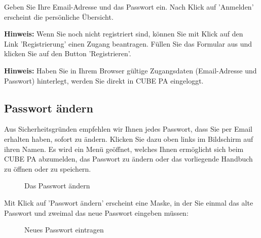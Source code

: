 Geben Sie Ihre Email-Adresse und das Passwort ein. Nach Klick auf 'Anmelden' erscheint die persönliche Übersicht.

\vspace{\baselineskip}

\textbf{Hinweis:} Wenn Sie noch nicht registriert sind, können Sie mit Klick auf den Link 'Registrierung' einen Zugang beantragen. Füllen Sie das Formular aus und klicken Sie auf den Button 'Registrieren'.

\vspace{\baselineskip}

\textbf{Hinweis:} Haben Sie in Ihrem Browser gültige Zugangsdaten (Email-Adresse und Passwort) hinterlegt, werden Sie direkt in CUBE PA eingeloggt.

\subsection{Passwort ändern}
\label{bkm:Ref434828103}

Aus Sicherheitsgründen empfehlen wir Ihnen jedes Passwort, dass Sie per Email erhalten haben, sofort zu ändern. Klicken Sie dazu oben links im Bildschirm auf ihren Namen. Es wird ein Menü geöffnet, welches Ihnen ermöglicht sich beim CUBE PA abzumelden, das Passwort zu ändern oder das vorliegende Handbuch zu öffnen oder zu speichern.

\begin{figure}[H]
\caption{Das Passwort ändern}
\end{figure}

Mit Klick auf 'Passwort ändern' erscheint eine Maske, in der Sie einmal das alte Passwort und zweimal das neue Passwort eingeben müssen:

\begin{figure}[H]
\caption{Neues Passwort eintragen}
\end{figure}

